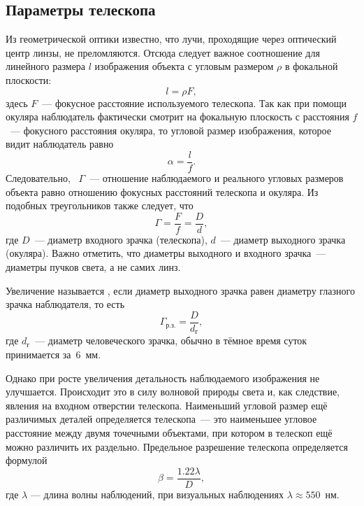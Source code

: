 \subsection{Параметры телескопа}
Из геометрической оптики известно, что лучи, проходящие через оптический центр линзы, не преломляются. Отсюда следует важное соотношение для линейного размера $l$ изображения объекта с угловым размером $\rho$ в фокальной плоскости:
\begin{equation}
    l = \rho F,
\end{equation}
здесь $F$~--- фокусное расстояние используемого телескопа.
Так как при помощи окуляра наблюдатель фактически смотрит на фокальную плоскость с расстояния $f$~--- фокусного расстояния окуляра, то угловой размер изображения, которое видит наблюдатель равно
\begin{equation}
    \alpha = \frac{l}{f}.
    \label{eq:zoom2}
\end{equation}
Следовательно, ~$\Gamma$~--- отношение наблюдаемого и реального угловых размеров объекта равно отношению фокусных расстояний телескопа и окуляра. Из подобных треугольников также следует, что
\begin{equation}
    \Gamma =\frac{F}{f} = \frac{D}{d},
    \label{eq:zoom1}
\end{equation}
где $D$~--- диаметр входного зрачка (телескопа), $d$~--- диаметр выходного зрачка (окуляра). Важно отметить, что диаметры выходного и входного зрачка~--- диаметры пучков света, а не самих линз.

Увеличение называется , если диаметр выходного зрачка равен диаметру глазного зрачка наблюдателя, то есть
\begin{equation}
    \Gamma_\text{р.з.} = \frac{D}{d_\text{г}},
\end{equation}
где $d_\text{г}$~--- диаметр человеческого зрачка, обычно в тёмное время суток принимается за~6~мм.

Однако при росте увеличения детальность наблюдаемого изображения не улучшается. Происходит это в силу волновой природы света и, как следствие, явления  на входном отверстии телескопа. Наименьший угловой размер ещё различимых деталей определяется  телескопа~--- это наименьшее угловое расстояние между двумя точечными объектами, при котором в телескоп ещё можно различить их раздельно. Предельное разрешение телескопа определяется формулой
\begin{equation}
    \beta = \frac{1.22\lambda}{D},
\end{equation}
где $\lambda$ --- длина волны наблюдений, при визуальных наблюдениях $\lambda \approx 550$~нм.

